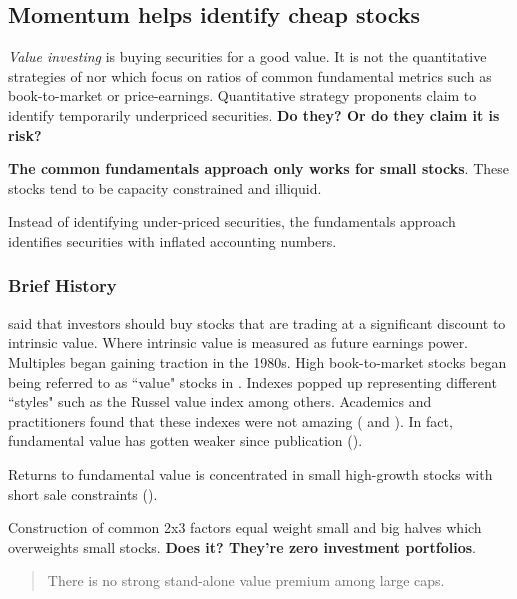 
\subsection{Momentum helps identify cheap stocks \cite{kok2017facts}}

\emph{Value investing} is buying securities  for a good value.
It is not the quantitative strategies of \cite{lakonishok1994contrarian} nor 
\cite{chan2004value} which focus on ratios of common fundamental metrics such 
as book-to-market or price-earnings.
Quantitative strategy proponents claim to identify temporarily underpriced 
securities. \textbf{Do they? Or do they claim it is risk?}

\textbf{The common fundamentals approach only works for small stocks}.
These stocks tend to be capacity constrained and illiquid.

Instead of identifying under-priced securities, the fundamentals approach 
identifies securities with inflated accounting numbers.

\subsubsection{Brief History}

\cite{graham1934security} said that investors should buy stocks that are 
trading at a significant discount to intrinsic value.
Where intrinsic value is measured as future earnings power.
Multiples began gaining traction in the 1980s.
High book-to-market stocks began being referred to as ``value" stocks in 
\cite{fama1992cross}.
Indexes popped up representing different ``styles" such as the Russel value 
index among others.
Academics and practitioners found that these indexes were not amazing 
(\cite{loughran1997book} and \cite{asness2015fact}).
In fact, fundamental value has gotten weaker since publication 
(\cite{mclean2016does}).

Returns to fundamental value is concentrated in small high-growth stocks with 
short sale constraints (\cite{nagel2005short}).

Construction of common 2x3 factors equal weight small and big halves which 
overweights small stocks. \textbf{Does it? They're zero investment portfolios}.

\cite{asness2015fact}
\begin{quotation}
  There is no strong stand-alone value premium among large caps.
\end{quotation}

